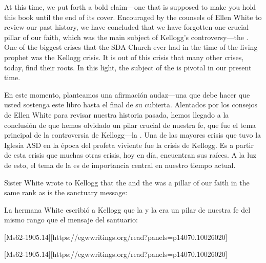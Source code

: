 At this time, we put forth a bold claim—one that is supposed to make you hold this book until the end of its cover. Encouraged by the counsels of Ellen White to review our past history, we have concluded that we have forgotten one crucial pillar of our faith, which was the main subject of Kellogg’s controversy—the . One of the biggest crises that the SDA Church ever had in the time of the living prophet was the Kellogg crisis. It is out of this crisis that many other crises, today, find their roots. In this light, the subject of the  is pivotal in our present time.


En este momento, planteamos una afirmación audaz—una que debe hacer que usted sostenga este libro hasta el final de su cubierta. Alentados por los consejos de Ellen White para revisar nuestra historia pasada, hemos llegado a la conclusión de que hemos olvidado un pilar crucial de nuestra fe, que fue el tema principal de la controversia de Kellogg—la . Una de las mayores crisis que tuvo la Iglesia ASD en la época del profeta viviente fue la crisis de Kellogg. Es a partir de esta crisis que muchas otras crisis, hoy en día, encuentran sus raíces. A la luz de esto, el tema de la  es de importancia central en nuestro tiempo actual.


Sister White wrote to Kellogg that the  and the  was a pillar of our faith in the same rank as is the sanctuary message:


La hermana White escribió a Kellogg que la  y la  era un pilar de nuestra fe del mismo rango que el mensaje del santuario:


[Ms62-1905.14][https://egwwritings.org/read?panels=p14070.10026020]


[Ms62-1905.14][https://egwwritings.org/read?panels=p14070.10026020]


